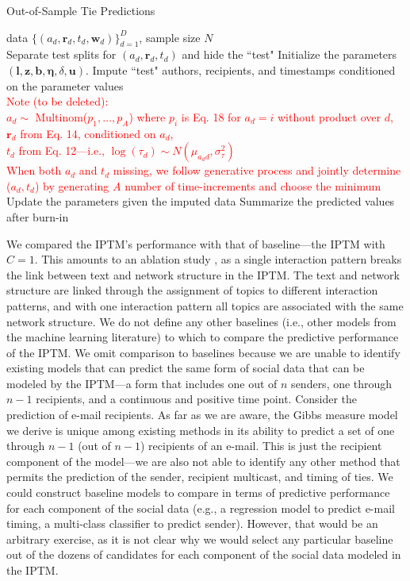 \documentclass{article}
\begin{document}
\begin{algorithm}[ht]
	\caption{Out-of-Sample Tie Predictions}
	\label{alg:PPE}
	\begin{algorithmic}
		 data $ \{ (a_d, \boldsymbol{r}_d, t_d,  \boldsymbol{w}_d)\}_{d=1}^D$, sample size $N$\\
		Separate test splits for $(a_d, \boldsymbol{r}_d, t_d)$ and hide the ``test"
		\STATE Initialize the parameters $(\boldsymbol{l}, \boldsymbol{z}, \boldsymbol{b}, \boldsymbol{\eta},\delta, \boldsymbol{u})$.
		\STATE Impute ``test" authors, recipients, and timestamps conditioned on the parameter values\\
		\textcolor{red}{Note (to be deleted):\\
			 $a_d\sim$ Multinom($p_1,\ldots,p_A$) where $p_i$ is Eq. 18 for $a_d=i$ without product over $d$, \\
			 $\boldsymbol{r}_d$ from Eq. 14, conditioned on $a_d$, \\
			 $t_d$ from Eq. 12---i.e., $\log(\tau_d) \sim N(\mu_{a_dd}, \sigma_{\tau}^2)$\\
			 When both $a_d$ and $t_d$ missing, we follow generative process and jointly determine ($a_d, t_d$) by generating $A$ number of time-increments and choose the minimum}
		\STATE Update the parameters given the imputed data
		\ENDFOR
		\STATE Summarize the predicted values after burn-in
		\end{algorithmic}
\end{algorithm}

We compared the IPTM's performance with that of baseline---the IPTM with $C=1$. This amounts to an ablation study \citep{richardson2006beyond,bilgic2010active}, as a single interaction pattern breaks the link between text and network structure in the IPTM. The text and network structure are linked through the assignment of topics to different interaction patterns, and with one interaction pattern all topics are associated with the same network structure. We do not define any other baselines (i.e., other models from the machine learning literature) to which to compare the predictive performance of the IPTM. We omit comparison to baselines because we are unable to identify existing models that can predict the same form of social data that can be modeled by the IPTM---a form that includes one out of $n$ senders, one through $n-1$ recipients, and a continuous and positive time point. Consider the prediction of e-mail recipients. As far as we are aware, the Gibbs measure model we derive is unique among existing methods in its ability to predict a set of one through $n-1$ (out of $n-1$) recipients of an e-mail. This is just the recipient component of the model---we are also not able to identify any other method that permits the prediction of the sender, recipient multicast, and timing of ties. We could construct baseline models to compare in terms of predictive performance for each component of the social data (e.g., a regression model to predict e-mail timing, a multi-class classifier to predict sender). However, that would be an arbitrary exercise, as it is not clear why we would select any particular baseline out of the dozens of candidates for each component of the social data modeled in the IPTM. 
\end{document}
